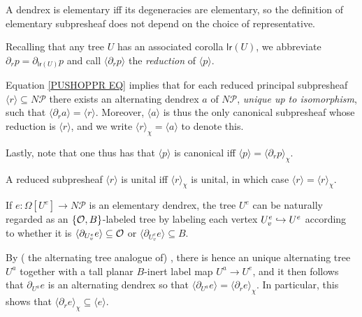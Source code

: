 \documentclass[a4paper,10pt
,draft
]{article}%
\renewcommand{\1}{\eta}%
\begin{document}
\begin{remark}
A dendrex is elementary iff its degeneracies are elementary,
so the definition of elementary subpresheaf does not depend on the choice of representative.
\end{remark}


\begin{notation}
Recalling that any tree $U$
has an associated corolla $\mathsf{lr}(U)$, 
we abbreviate
$\partial_r p = \partial_{\mathsf{lr}(U)}p$
and call
$\langle \partial_r p \rangle$
the \emph{reduction} of  
$\langle p \rangle$.
\end{notation}




\begin{remark}\label{PUSHOPPRRST REM}
Equation \eqref{PUSHOPPR EQ} 
implies
that for each reduced principal subpresheaf
$\langle r \rangle \subseteq N \mathcal{P}$
there exists an alternating dendrex $a$ of $N \mathcal P$, 
\emph{unique up to isomorphism}, 
such that
$\langle \partial_r a \rangle = \langle r \rangle$.
%
Moreover, $\langle a \rangle$ is thus the only canonical subpresheaf whose reduction is 
$\langle r \rangle$,
and we write
$\langle r \rangle_{\chi} = \langle a \rangle$
to denote this.

Lastly, note that one thus has that 
$\langle p \rangle$ is canonical iff
$\langle p \rangle = \langle \partial_r p \rangle_{\chi}$.
\end{remark}


\begin{remark}\label{UNITALCASE REM}
A reduced subpresheaf $\langle r \rangle$
is unital iff 
$\langle r \rangle_{\chi}$ is unital, in which case
$\langle r \rangle = \langle r \rangle_{\chi}$.
\end{remark}



\begin{remark}\label{ELEMLABEL REM}
If $e \colon \Omega[U^e] \to N \mathcal{P}$
is an  elementary dendrex, 
the tree $U^e$ can be naturally regarded as an
$\{\mathcal{O},B\}$-labeled tree by labeling each vertex $U^e_v \hookrightarrow U^e$ according to whether
it is $\langle \partial_{U^e_v} e\rangle \subseteq \mathcal{O} $ or
$\langle \partial_{U^e_v} e\rangle \subseteq B$.

By ({\color{blue} the alternating tree analogue of})
\cite[Prop. 5.48]{BP_geo}, there is hence an unique alternating tree $U^a$ together with a tall planar $B$-inert label map $U^a \to U^e$,
and it then follows that
$\partial_{U^a} e$ is an alternating dendrex so that
$\langle \partial_{U^a} e \rangle = \langle \partial_r e \rangle_{\chi}$.
%
In particular, this shows that
$\langle \partial_r e \rangle_{\chi} \subseteq 
\langle e \rangle$.
\end{remark}
\end{document}
